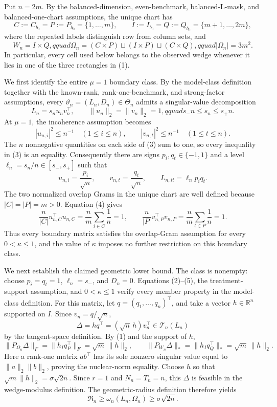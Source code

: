 Put \(n=2m\).  By the balanced-dimension, even-benchmark, balanced-L-mask, and balanced-one-chart assumptions, the unique chart has
\[
C:=C_{b_0}=P:=P_{b_0}=\{1,\ldots,m\},\qquad
I:=I_{b_0}=Q:=Q_{b_0}=\{m+1,\ldots,2m\},
\]
where the repeated labels distinguish row from column sets, and
\[
W_n=I\times Q,qquad
\Omega_n=(C\times P)\mathbin{\sqcup}(I\times P)
\mathbin{\sqcup}(C\times Q),qquad |\Omega_n|=3m^2.       \tag{1}
\]
In particular, every cell used below belongs to the observed wedge whenever it lies in one of the three rectangles in (1).

We first identify the entire \(\mu=1\) boundary class.  By the model-class definition together with the known-rank, rank-one-benchmark, and strong-factor assumptions, every \(\vartheta_n=(L_n,D_n)\in\Theta_n\) admits a singular-value decomposition
\[
L_n=s_nu_nv_n^{\top},\qquad
\lVert u_n\rVert_2=\lVert v_n\rVert_2=1,qquad
s_-n\le s_n\le s_+n.                                    \tag{2}
\]
At \(\mu=1\), the incoherence assumption becomes
\[
|u_{n,i}|^2\le n^{-1}\quad(1\le i\le n),
\qquad |v_{n,t}|^2\le n^{-1}\quad(1\le t\le n).        \tag{3}
\]
The \(n\) nonnegative quantities on each side of (3) sum to one, so every inequality in (3) is an equality.  Consequently there are signs \(p_i,q_t\in\{-1,1\}\) and a level \(\ell_n=s_n/n\in[s_-,s_+]\) such that
\[
u_{n,i}=\frac{p_i}{\sqrt n},\qquad
v_{n,t}=\frac{q_t}{\sqrt n},\qquad
L_{n,it}=\ell_np_iq_t.                                  \tag{4}
\]
The two normalized overlap Grams in the unique chart are well defined because \(|C|=|P|=m>0\).  Equation (4) gives
\[
\frac{n}{|C|}u_{n,C}^{\top}u_{n,C}
=\frac{n}{m}\sum_{i\in C}\frac1n=1,
\qquad
\frac{n}{|P|}v_{n,P}^{\top}v_{n,P}
=\frac{n}{m}\sum_{t\in P}\frac1n=1.                  \tag{5}
\]
Thus every boundary matrix satisfies the overlap-Gram assumption for every \(0<\kappa\le1\), and the value of \(\kappa\) imposes no further restriction on this boundary class.

We next establish the claimed geometric lower bound.  The class is nonempty: choose \(p_i=q_t=1\), \(\ell_n=s_-\), and \(D_n=0\).  Equations (2)--(5), the treatment-support assumption, and \(0<\kappa\le1\) verify every member property in the model-class definition.  For this matrix, let \(q=(q_1,\ldots,q_n)^{\top}\), and take a vector \(h\in\mathbb R^n\) supported on \(I\).  Since \(v_n=q/\sqrt n\),
\[
\Delta=hq^{\top}=(\sqrt n\,h)v_n^{\top}\in\mathcal T_n(L_n)       \tag{6}
\]
by the tangent-space definition.  By (1) and the support of \(h\),
\[
\lVert P_{\Omega_n}\Delta\rVert_F
=\lVert h_Iq_P^{\top}\rVert_F
=\sqrt m\,\lVert h\rVert_2,
\qquad
\lVert P_{W_n}\Delta\rVert_*
=\lVert h_Iq_Q^{\top}\rVert_*
=\sqrt m\,\lVert h\rVert_2.                            \tag{7}
\]
Here a rank-one matrix \(ab^{\top}\) has its sole nonzero singular value equal to \(\lVert a\rVert_2\lVert b\rVert_2\), proving the nuclear-norm equality.  Choose \(h\) so that \(\sqrt m\lVert h\rVert_2=\sigma\sqrt{2n}\).  Since \(r=1\) and \(N_n=T_n=n\), this \(\Delta\) is feasible in the wedge-modulus definition.  The geometric-radius definition therefore yields
\[
\mathfrak R_n\ge \omega_n(L_n,\Omega_n)
\ge\sigma\sqrt{2n}.                                    \tag{8}
\]

